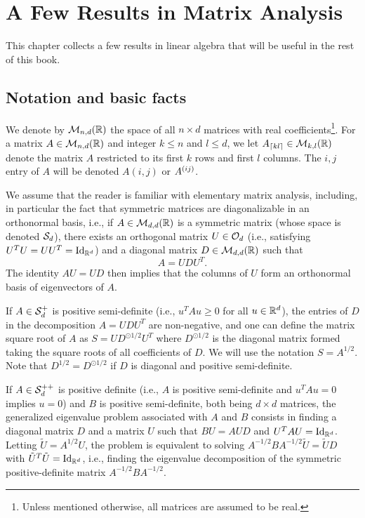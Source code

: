 \chapter{A Few Results in Matrix Analysis}
\label{chap:linalg}

This chapter collects a few results in linear algebra that will be useful in the rest of this book.

\section{Notation and basic facts}
We  denote by ${\mathcal M}_{n,d}({\mathbb{R}})$ the space of all $n\times d$ matrices with real coefficients\footnote{Unless mentioned otherwise, all matrices are assumed to be real.}. For a matrix $A\in {\mathcal M}_{n,d}({\mathbb{R}})$ and integer $k\leq n$ and $l\leq d$, we let $A_{\lceil kl\rceil}\in {\mathcal M}_{k,l}({\mathbb{R}})$ denote the matrix $A$ restricted to its first $k$ rows and first $l$ columns. The $i,j$ entry of $A$ will be denoted $A(i,j)$ or $A^{(ij)}$.

We assume that the reader is familiar with elementary matrix analysis, including, in particular the fact that symmetric matrices are diagonalizable in an orthonormal basis, i.e., if $A \in {\mathcal M}_{d,d}({\mathbb{R}})$ is a symmetric matrix (whose space is denoted ${\mathcal S}_d$), there exists an orthogonal  matrix $U\in {\mathcal O}_d$ (i.e., satisfying $U^TU = UU^T = \Id[d]$) and a diagonal matrix $D\in {\mathcal M}_{d,d}({\mathbb{R}})$ such that
\[
A = UDU^T.
\]
The identity $AU = UD$ then implies that the columns of $U$ form an orthonormal basis of eigenvectors of $A$. 

If $A\in {\mathcal S}^+_d$ is positive semi-definite (i.e., $u^T Au \geq 0$ for all $u\in {\mathbb{R}}^d$), the entries of  $D$ in the decomposition $A = UDU^T$ are non-negative, and one can define the matrix square root of $A$ as $S = UD^{\odot 1/2} U^T$ where  $D^{\odot 1/2}$ is the diagonal matrix formed taking the square roots of all  coefficients of $D$. We will use the notation $S = A^{1/2}$. Note that $D^{1/2} = D^{\odot 1/2}$ if $D$ is diagonal and positive semi-definite. 

If  $A\in {\mathcal S}^{++}_d$ is positive definite (i.e., $A$ is positive semi-definite and $u^TAu=0$ implies $u=0$) and $B$ is positive semi-definite, both being $d\times d$ matrices, the generalized eigenvalue problem associated with $A$ and $B$ consists in finding a diagonal matrix $D$ and a matrix $U$ such that $BU = AUD$ and $U^TAU = \Id[d]$. Letting $\tilde U = A^{1/2} U$, the problem is equivalent to solving $A^{-1/2} B A^{-1/2} \tilde U = \tilde U D$ with $\tilde U^T \tilde U = \Id[d]$, i.e., finding the eigenvalue decomposition of the symmetric positive-definite matrix $A^{-1/2} B A^{-1/2}$.

